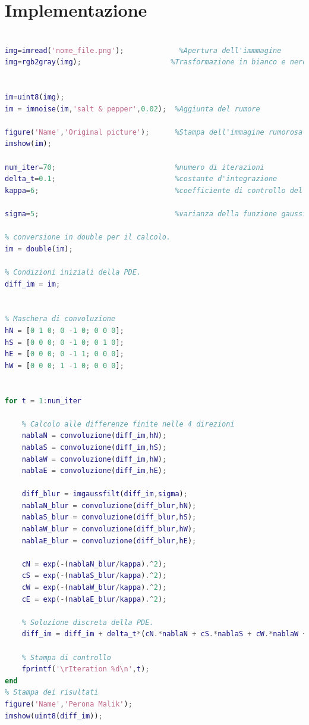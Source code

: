 \section{Implementazione}
\begin{lstlisting}[language=MATLAB]

img=imread('nome_file.png');             %Apertura dell'immmagine
img=rgb2gray(img);                     %Trasformazione in bianco e nero


im=uint8(img);
im = imnoise(im,'salt & pepper',0.02);  %Aggiunta del rumore

figure('Name','Original picture');      %Stampa dell'immagine rumorosa
imshow(im);

num_iter=70;                            %numero di iterazioni
delta_t=0.1;                            %costante d'integrazione
kappa=6;                                %coefficiente di controllo del gradiente

sigma=5;                                %varianza della funzione gaussiana

% conversione in double per il calcolo.
im = double(im);

% Condizioni iniziali della PDE.
diff_im = im;


% Maschera di convoluzione
hN = [0 1 0; 0 -1 0; 0 0 0];
hS = [0 0 0; 0 -1 0; 0 1 0];
hE = [0 0 0; 0 -1 1; 0 0 0];
hW = [0 0 0; 1 -1 0; 0 0 0];


for t = 1:num_iter
   
    % Calcolo alle differenze finite nelle 4 direzioni
    nablaN = convoluzione(diff_im,hN);
    nablaS = convoluzione(diff_im,hS);   
    nablaW = convoluzione(diff_im,hW);
    nablaE = convoluzione(diff_im,hE);
    
    diff_blur = imgaussfilt(diff_im,sigma);
    nablaN_blur = convoluzione(diff_blur,hN);
    nablaS_blur = convoluzione(diff_blur,hS);   
    nablaW_blur = convoluzione(diff_blur,hW);
    nablaE_blur = convoluzione(diff_blur,hE);

    cN = exp(-(nablaN_blur/kappa).^2);
    cS = exp(-(nablaS_blur/kappa).^2);
    cW = exp(-(nablaW_blur/kappa).^2);
    cE = exp(-(nablaE_blur/kappa).^2);

    % Soluzione discreta della PDE.
    diff_im = diff_im + delta_t*(cN.*nablaN + cS.*nablaS + cW.*nablaW + cE.*nablaE );
           
    % Stampa di controllo
    fprintf('\rIteration %d\n',t);
end
% Stampa dei risultati
figure('Name','Perona Malik');
imshow(uint8(diff_im));

\end{lstlisting}